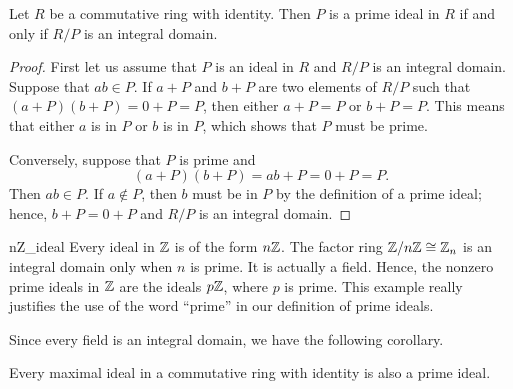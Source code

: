  
\begin{proposition}
Let $R$ be a commutative ring with identity. Then $P$ is a prime ideal
in $R$ if and only if $R/P$ is an integral domain.  
\end{proposition}
 
 
\begin{proof}
First let us assume that $P$ is an ideal in $R$ and $R/P$ is an
integral domain.  Suppose that $ab \in P$. If $a +P$ and $b+P$ are two 
elements of $R/P$ such that $(a+P)(b+P) = 0+P = P$, then either $a + P
= P$ or $b+P = P$.  This means that either $a$ is in $P$ or $b$ is in
$P$, which shows that $P$ must be prime. 
 
 
Conversely, suppose that $P$ is prime and 
\[
(a +P)(b+P) = ab + P = 0 + P = P. 
\]
Then $ab \in P$. If $a \notin P$, then $b$ must be in $P$ by the
definition of a prime ideal; hence, $b + P = 0 + P$ and $R/P$ is an
integral domain. 
\end{proof}
 
 
\begin{example}{nZ_ideal}
Every ideal in ${\Bbb Z}$ is of the form $n {\Bbb Z}$.  The factor
ring ${\Bbb Z} / n{\Bbb Z} \cong {\Bbb Z}_n$ is an integral domain
only when $n$ is prime.  It is actually a field.  Hence, the nonzero
prime ideals in ${\Bbb Z}$ are the ideals $p{\Bbb Z}$, where $p$ is
prime. This example really justifies the use of the word ``prime'' in
our  definition of prime ideals. 
\mbox{\hspace{1in}}  
\end{example}
 
 

 
 
Since every field is an integral domain, we have the following
corollary.
 
 

 
 
\begin{corollary}
Every maximal ideal in a commutative ring with identity is also a
prime ideal. 
\end{corollary}
 
 

 
\histhead
 
